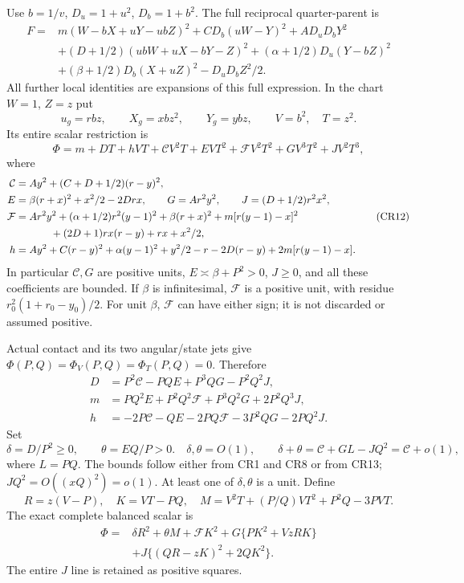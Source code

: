 Use $b=1/v$, $D_u=1+u^2$, $D_b=1+b^2$. The full reciprocal
quarter-parent is
\[
\begin{aligned}
 F={}&m(W-bX+uY-ubZ)^2+CD_b(uW-Y)^2+AD_uD_bY^2\\
 &+(D+1/2)(ubW+uX-bY-Z)^2
 +(\alpha+1/2)D_u(Y-bZ)^2\\
 &+(\beta+1/2)D_b(X+uZ)^2-D_uD_bZ^2/2.
\end{aligned}\tag{CR9}
\]
All further local identities are expansions of this full expression.
In the chart $W=1$, $Z=z$ put
\[
 u_g=rbz,\qquad X_g=xbz^2,\qquad Y_g=ybz,
 \qquad V=b^2,\quad T=z^2.
 \tag{CR10}
\]
Its entire scalar restriction is
\[
 \Phi=m+DT+hVT+\mathcal C V^2T+EVT^2+
 \mathcal F V^2T^2+GV^3T^2+JV^2T^3,
 \tag{CR11}
\]
where
\[
\begin{aligned}
 \mathcal C&=Ay^2+(C+D+1/2)(r-y)^2,\\
 E&=\beta(r+x)^2+x^2/2-2Drx,\qquad
 G=Ar^2y^2,\qquad J=(D+1/2)r^2x^2,\\
 \mathcal F&=Ar^2y^2+(\alpha+1/2)r^2(y-1)^2
       +\beta(r+x)^2+m[r(y-1)-x]^2\\
 &\hspace{12mm}+(2D+1)rx(r-y)+rx+x^2/2,\\
 h&=Ay^2+C(r-y)^2+\alpha(y-1)^2+y^2/2-r
          -2D(r-y)+2m[r(y-1)-x].
\end{aligned}\tag{CR12}
\]
In particular $\mathcal C,G$ are positive units,
$E\asymp\beta+P^2>0$, $J\geq0$, and all these coefficients
are bounded. If $\beta$ is infinitesimal, $\mathcal F$ is a
positive unit, with residue $r_0^2(1+r_0-y_0)/2$.
For unit $\beta$, $\mathcal F$ can have either sign; it is not
discarded or assumed positive.

Actual contact and its two angular/state jets give
$\Phi(P,Q)=\Phi_V(P,Q)=\Phi_T(P,Q)=0$. Therefore
\[
\begin{aligned}
 D&=P^2\mathcal C-PQE+P^3QG-P^2Q^2J,\\
 m&=PQ^2E+P^2Q^2\mathcal F+P^3Q^2G+2P^2Q^3J,\\
 h&=-2P\mathcal C-QE-2PQ\mathcal F-3P^2QG-2PQ^2J.
\end{aligned}\tag{CR13}
\]
Set
\[
 \delta=D/P^2\geq0,\qquad \theta=EQ/P>0.
 \quad \delta,\theta=O(1),\qquad
 \delta+\theta=\mathcal C+GL-JQ^2=\mathcal C+o(1),
 \tag{CR14}
\]
where $L=PQ$. The bounds follow either from CR1 and CR8 or from CR13;
$JQ^2=O((xQ)^2)=o(1)$. At least one of $\delta,\theta$
is a unit. Define
\[
 R=z(V-P),\quad K=VT-PQ,\quad
 M=V^2T+(P/Q)VT^2+P^2Q-3PVT.
\]
The exact complete balanced scalar is
\[
\begin{aligned}
 \Phi={}&\delta R^2+\theta M+\mathcal F K^2
       +G\{PK^2+VzRK\}\\
       &+J\{(QR-zK)^2+2QK^2\}.
\end{aligned}\tag{CR15}
\]
The entire $J$ line is retained as positive squares.

